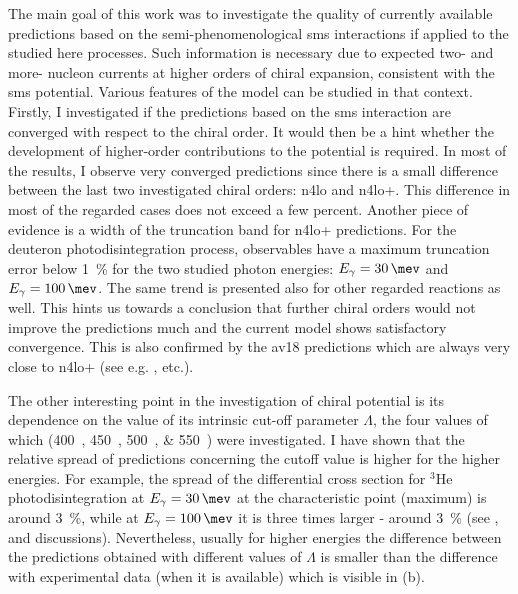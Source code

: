 The main goal of this work was to investigate the quality of currently available
predictions based on the semi-phenomenological \gls{sms}
interactions if applied to the studied here processes.
Such information is necessary due to expected two- and more- nucleon currents
at higher orders of chiral expansion, consistent with the \gls{sms} potential.
Various features of the model can be studied in that context.
Firstly, I investigated if the predictions based on the \gls{sms} interaction
are converged with respect to the chiral order.
It would then be a hint whether the development of higher-order contributions to the potential is required.
In most of the results, I observe very converged predictions since there is a small difference
between the last two investigated chiral orders: \gls{n4lo} and \gls{n4lo+}. This
difference in most of the regarded cases does not exceed a few percent.
Another piece of evidence is a width of the truncation band for \gls{n4lo+} predictions.
For the deuteron photodisintegration process, observables have a maximum
truncation error below \SI{1}{\percent} for the two studied photon energies:
$E_\gamma=\SI{30}{\mev}$ and $E_\gamma=\SI{100}{\mev}$.
The same trend is presented also for other regarded reactions as well.
This hints us towards a conclusion that further chiral orders would not
improve the predictions much and the current model shows satisfactory convergence.
This is also confirmed by the \gls{av18} predictions which are
always very close to \gls{n4lo+} (see e.g. ,  etc.).

The other interesting point in the investigation of chiral potential is its dependence
on the value of its intrinsic cut-off parameter $\Lambda$, the four values of which (\SIlist[list-units = single]{400;450;500;550}{\mev}) 
were investigated. I have shown that the relative spread of predictions 
concerning the cutoff value is higher for the higher energies.
For example, the spread of the differential cross section for $^3$He photodisintegration
at $E_\gamma=\SI{30}{\mev}$ at the characteristic point (maximum) is around \SI{3}{\percent},
while at $E_\gamma=\SI{100}{\mev}$ it is three times larger - around \SI{3}{\percent}
(see ,  and discussions).
Nevertheless, usually for higher energies the difference between the predictions
obtained with different values of $\Lambda$ is smaller than the difference with experimental
data (when it is available) which is visible in (b).

